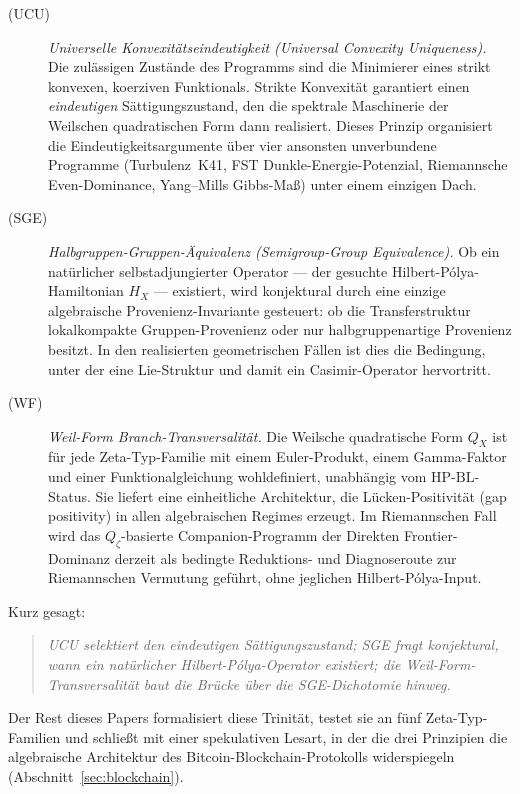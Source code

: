 \documentclass[11pt]{article}
\theoremstyle{definition}
\theoremstyle{remark}
\newcommand{\HBL}{\mathrm{HP\text{-}BL}}
\begin{document}
\begin{description}
\item[(UCU)] \emph{Universelle Konvexitätseindeutigkeit (Universal Convexity Uniqueness).} Die zulässigen
  Zustände des Programms sind die Minimierer eines strikt konvexen,
  koerziven Funktionals. Strikte Konvexität garantiert einen \emph{eindeutigen}
  Sättigungszustand, den die spektrale Maschinerie der Weilschen quadratischen
  Form dann realisiert. Dieses Prinzip organisiert die Eindeutigkeitsargumente
  über vier ansonsten unverbundene Programme (Turbulenz~K41, FST Dunkle-Energie-Potenzial,
  Riemannsche Even-Dominance, Yang--Mills Gibbs-Maß) unter einem einzigen Dach.

\item[(SGE)] \emph{Halbgruppen-Gruppen-Äquivalenz (Semigroup-Group Equivalence).} Ob ein natürlicher
  selbstadjungierter Operator --- der gesuchte Hilbert-P\'olya-Hamiltonian
  $H_X$ --- existiert, wird konjektural durch eine einzige algebraische
  Provenienz-Invariante gesteuert: ob die Transferstruktur lokalkompakte
  Gruppen-Provenienz oder nur halbgruppenartige Provenienz besitzt. In den
  realisierten geometrischen Fällen ist dies die Bedingung, unter der eine
  Lie-Struktur und damit ein Casimir-Operator hervortritt.

\item[(WF)] \emph{Weil-Form Branch-Transversalität.} Die Weilsche quadratische Form $Q_X$ ist
  für jede Zeta-Typ-Familie mit einem Euler-Produkt, einem Gamma-Faktor und
  einer Funktionalgleichung wohldefiniert, unabhängig vom $\HBL$-Status. Sie
  liefert eine einheitliche Architektur, die Lücken-Positivität (gap positivity) in allen
  algebraischen Regimes erzeugt. Im Riemannschen Fall wird das
  $Q_\zeta$-basierte Companion-Programm der Direkten Frontier-Dominanz
  \cite{Geiger2026RHII} derzeit als bedingte Reduktions- und
  Diagnoseroute zur Riemannschen Vermutung geführt, ohne jeglichen
  Hilbert-P\'olya-Input.
\end{description}

Kurz gesagt:

\begin{quote}
\emph{UCU selektiert den eindeutigen Sättigungszustand; SGE fragt konjektural,
wann
ein natürlicher Hilbert-P\'olya-Operator existiert; die Weil-Form-Transversalität
baut die Brücke über die SGE-Dichotomie hinweg.}
\end{quote}

Der Rest dieses Papers formalisiert diese Trinität, testet sie an
fünf Zeta-Typ-Familien und schließt mit einer spekulativen Lesart, in der
die drei Prinzipien die algebraische Architektur des Bitcoin-Blockchain-Protokolls
widerspiegeln (Abschnitt~\ref{sec:blockchain}).
\end{document}
